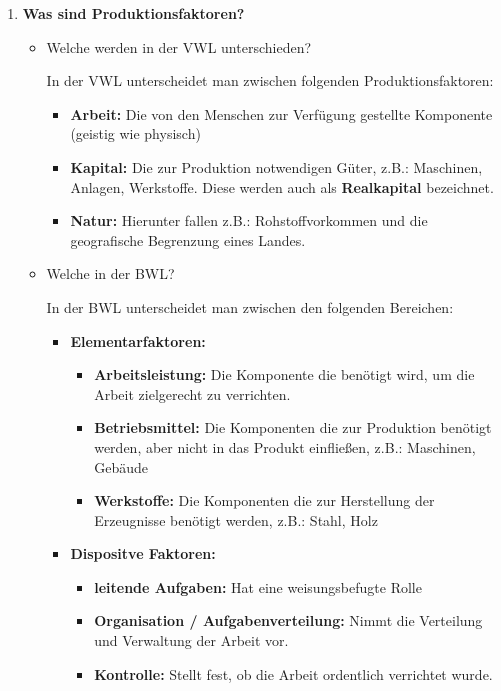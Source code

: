 \documentclass[a4paper,11pt]{scrartcl}	%
\begin{document}
\begin{enumerate}
\item \textbf{Was sind Produktionsfaktoren?}
	\begin{itemize}
		\item Welche werden in der VWL unterschieden?\par
		In der VWL unterscheidet man zwischen folgenden Produktionsfaktoren:
			\begin{itemize}
				\item \textbf{Arbeit:} Die von den Menschen zur Verfügung gestellte Komponente (geistig wie physisch)
				\item \textbf{Kapital:} Die zur Produktion notwendigen Güter, z.B.: Maschinen, Anlagen, Werkstoffe.
				Diese werden auch als \textbf{Realkapital} bezeichnet.
				\item \textbf{Natur:} Hierunter fallen z.B.: Rohstoffvorkommen und die geografische Begrenzung eines Landes.
			\end{itemize}
		\item Welche in der BWL?\par
		In der BWL unterscheidet man zwischen den folgenden Bereichen:
		\begin{itemize}
		\item \textbf{Elementarfaktoren:}
					
			\begin{itemize}
				\item \textbf{Arbeitsleistung:} Die Komponente die benötigt wird, um die Arbeit zielgerecht zu verrichten.
				\item \textbf{Betriebsmittel:} Die Komponenten die zur Produktion benötigt werden, aber nicht in das
				Produkt einfließen, z.B.: Maschinen, Gebäude
				\item \textbf{Werkstoffe:} Die Komponenten die zur Herstellung der Erzeugnisse benötigt werden, 
				z.B.: Stahl, Holz
			\end{itemize}
		\item \textbf{Dispositve Faktoren:}
			\begin{itemize}
				\item \textbf{leitende Aufgaben:} Hat eine weisungsbefugte Rolle
				\item \textbf{Organisation / Aufgabenverteilung:} Nimmt die Verteilung und Verwaltung der Arbeit vor.
				\item \textbf{Kontrolle:} Stellt fest, ob die Arbeit ordentlich verrichtet wurde.
			\end{itemize}
		\end{itemize}
	\end{itemize}
\end{enumerate}	
\end{document}
